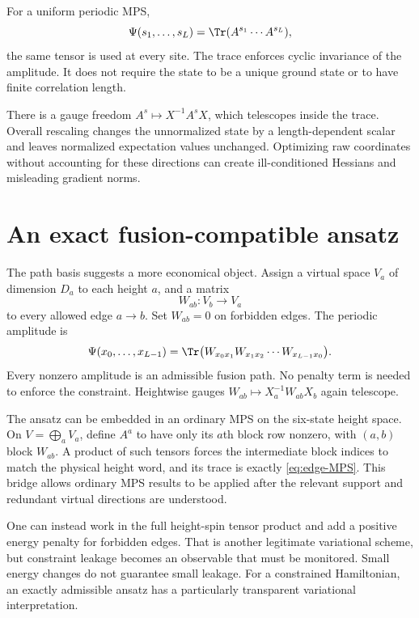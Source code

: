 For a uniform periodic MPS,
\begin{equation}
 \Psi(s_1,\ldots,s_L)=\Tr(A^{s_1}\cdots A^{s_L}),
 \label{eq:ordinary-MPS}
\end{equation}
the same tensor is used at every site. The trace enforces cyclic
invariance of the amplitude. It does not require the state to be a
unique ground state or to have finite correlation length.

There is a gauge freedom
$A^s\mapsto X^{-1}A^sX$, which telescopes inside the trace. Overall
rescaling changes the unnormalized state by a length-dependent scalar
and leaves normalized expectation values unchanged. Optimizing raw
coordinates without accounting for these directions can create
ill-conditioned Hessians and misleading gradient norms.

\section{An exact fusion-compatible ansatz}

The path basis suggests a more economical object. Assign a virtual
space $V_a$ of dimension $D_a$ to each height $a$, and a matrix
\[
 W_{ab}:V_b\longrightarrow V_a
\]
to every allowed edge $a\to b$. Set $W_{ab}=0$ on forbidden edges.
The periodic amplitude is
\begin{equation}
 \Psi(x_0,\ldots,x_{L-1})
 =\Tr\bigl(W_{x_0x_1}W_{x_1x_2}\cdots W_{x_{L-1}x_0}\bigr).
 \label{eq:edge-MPS}
\end{equation}
Every nonzero amplitude is an admissible fusion path. No penalty term is
needed to enforce the constraint. Heightwise gauges
$W_{ab}\mapsto X_a^{-1}W_{ab}X_b$ again telescope.

The ansatz can be embedded in an ordinary MPS on the six-state height
space. On $V=\bigoplus_aV_a$, define $A^a$ to have only its $a$th block
row nonzero, with $(a,b)$ block $W_{ab}$. A product of such tensors
forces the intermediate block indices to match the physical height
word, and its trace is exactly \eqref{eq:edge-MPS}. This bridge allows
ordinary MPS results to be applied after the relevant support and
redundant virtual directions are understood.

One can instead work in the full height-spin tensor product and add a
positive energy penalty for forbidden edges. That is another legitimate
variational scheme, but constraint leakage becomes an observable that
must be monitored. Small energy changes do not guarantee small leakage.
For a constrained Hamiltonian, an exactly admissible ansatz has a
particularly transparent variational interpretation.

